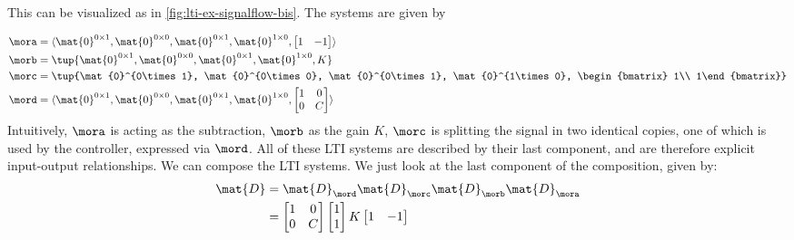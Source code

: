 {\begin{example}
        This can be visualized as in \cref{fig:lti-ex-signalflow-bis}.
        The systems are given by

        \begin{equation*}
            \begin{aligned}
                \mora & = \langle\mat{0}^{0\times 1}, \mat{0}^{0\times 0}, \mat{0}^{0\times 1}, \mat{0}^{1\times 0}, \begin{bmatrix} {1} & {-1}\end{bmatrix}\rangle \\
                \morb & =\tup{\mat{0}^{0\times 1}, \mat{0}^{0\times 0}, \mat{0}^{0\times 1}, \mat{0}^{1\times 0}, K} \\
                \morc & =\tup{\mat{0}^{0\times 1}, \mat{0}^{0\times 0}, \mat{0}^{0\times 1}, \mat{0}^{1\times 0}, \begin{bmatrix} 1\\ 1\end{bmatrix}} \\
                \mord & =\langle\mat{0}^{0\times 1}, \mat{0}^{0\times 0}, \mat{0}^{0\times 1}, \mat{0}^{1\times 0},
                \begin{bmatrix}
                    1 & 0 \\
                    0 & C
                \end{bmatrix}\rangle
            \end{aligned}
        \end{equation*}
        Intuitively, $\mora$ is acting as the subtraction, $\morb$ as the gain $K$, $\morc$ is splitting the signal in two identical copies, one of which is used by the controller, expressed via $\mord$.
        All of these LTI systems are described by their last component, and are therefore explicit input-output relationships.
        We can compose the LTI systems.
        We just look at the last component of the composition, given by:
        \begin{equation*}
            \begin{aligned}
                \mat{D} & =\mat{D}_\mord \mat{D}_\morc \mat{D}_\morb \mat{D}_\mora \\
                        & =\begin{bmatrix}1 & 0\\ 0 & {C}\end{bmatrix} \begin{bmatrix} 1\\ 1 \end{bmatrix}  K \begin{bmatrix} 1 & -1 \end{bmatrix} \\

\end{aligned}
\end{equation*}
\end{example}}
